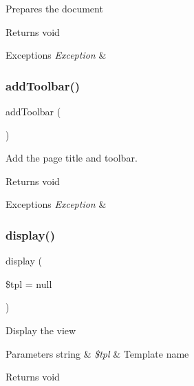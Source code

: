 Prepares the document

\begin{DoxyReturn}{Returns}
void
\end{DoxyReturn}

\begin{DoxyExceptions}{Exceptions}
{\em Exception} & \\
\hline
\end{DoxyExceptions}
\mbox{\label{classtks__agenda_view_item_af327e89538be614e923c7e5863319f43}} 
\subsubsection{add\+Toolbar()}
{\footnotesize\ttfamily add\+Toolbar (\begin{DoxyParamCaption}{ }\end{DoxyParamCaption})\hspace{0.3cm}{\ttfamily [protected]}}

Add the page title and toolbar.

\begin{DoxyReturn}{Returns}
void
\end{DoxyReturn}

\begin{DoxyExceptions}{Exceptions}
{\em Exception} & \\
\hline
\end{DoxyExceptions}
\mbox{\label{classtks__agenda_view_item_aa988850da0dbeb9875debea0280754d5}} 
\subsubsection{display()\hspace{0.1cm}{\footnotesize\ttfamily [1/4]}}
{\footnotesize\ttfamily display (\begin{DoxyParamCaption}\item[{}]{\$tpl = {\ttfamily null} }\end{DoxyParamCaption})}

Display the view


\begin{DoxyParams}[1]{Parameters}
string & {\em \$tpl} & Template name\\
\hline
\end{DoxyParams}
\begin{DoxyReturn}{Returns}
void
\end{DoxyReturn}

